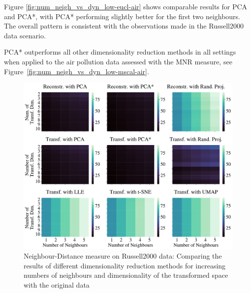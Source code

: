 \documentclass[pdftex,12pt,a4paper]{report}
\begin{document}
Figure \ref{fig:num_neigh_vs_dyn_low-eucl-air} shows comparable results for PCA and PCA*, with PCA* performing slightly better for the first two neighbours. 
The overall pattern is consistent with the observations made in the Russell2000 data scenario.

PCA* outperforms all other dimensionality reduction methods in all settings when applied to the air pollution data assessed with the MNR measure, see Figure~\ref{fig:num_neigh_vs_dyn_low-mscal-air}.


\begin{figure}
    \includegraphics[width = \textwidth]{images/real-world/russell2000_stock/dyn_low_dim_vs_num_neigh/euclidean/all_methods_1runs_1lines_504points_5neighbours.pdf}
    \caption{Neighbour-Distance measure on Russell2000 data: Comparing the results of different dimensionality reduction methods for increasing numbers of neighbours and dimensionality of the transformed space with the original data} \label{fig:num_neigh_vs_dyn_low-eucl-russel}
\end{figure}
\end{document}
